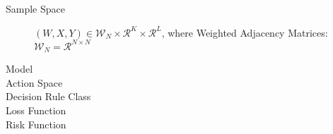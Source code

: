 \documentclass[12pt]{article}
\begin{document}
\begin{description}

\item[Sample Space] $(W, X, Y) \in \mathcal{W}_N \times \mathcal{R}^K  \times \mathcal{R}^L $, where 
Weighted Adjacency Matrices: $\mathcal{W}_N = \mathcal{R}^{N \times N}$

\item[Model]

\item[Action Space]


\item[Decision Rule Class]

\item[Loss Function]



\item[Risk Function]

\end{description}
\end{document}
